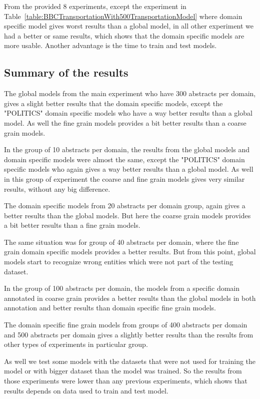 \documentclass[thesis=M,english]{FITthesis}[2018/05/30]
\begin{document}
From the provided 8 experiments, except the experiment in Table~\ref{table:BBCTransportationWith500TransportationModel} where domain specific model gives worst results than a global model, in all other experiment we had a better or same results, which shows that the domain specific models are more usable. Another advantage is the time to train and test models.
	
\subsection{Summary of the results}

The global models from the main experiment who have 300 abstracts per domain, gives a slight better results that the domain specific models, except the "POLITICS" domain specific models who have a way better results than a global model. As well the fine grain models provides a bit better results than a coarse grain models.

In the group of 10 abstracts per domain, the results from the global models and domain specific models were almost the same, except the "POLITICS" domain specific models who again gives a way better results than a global model. As well in this group of experiment the coarse and fine grain models gives very similar results, without any big difference.

The domain specific models from 20 abstracts per domain group, again gives a better results than the global models. But here the coarse grain models provides a bit better results than a fine grain models.

The same situation was for group of 40 abstracts per domain, where the fine grain domain specific models provides a better results. But from this point, global models start to recognize wrong entities which were not part of the testing dataset.

In the group of 100 abstracts per domain, the models from a specific domain annotated in coarse grain provides a better results than the global models in both annotation and better results than domain specific fine grain models.

The domain specific fine grain models from groups of 400 abstracts per domain and 500 abstracts per domain gives a slightly better results than the results from other types of experiments in particular group.

As well we test some models with the datasets that were not used for training the model or with bigger dataset than the model was trained. So the results from those experiments were lower than any previous experiments, which shows that results depends on data used to train and test model.
\end{document}
